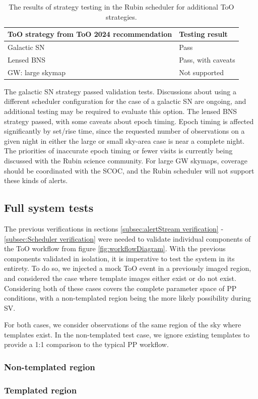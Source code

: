 \begin{table}[]
\centering
\begin{tabular}{|l|l|}
\hline
ToO strategy from ToO 2024 recommendation & Testing result       \\ \hline
Galactic SN                              & Pass                 \\ \hline
Lensed BNS                              & Pass, with caveats                 \\ \hline
GW: large skymap                              & Not supported                 \\ \hline
\end{tabular}
\caption{The results of strategy testing in the Rubin scheduler for additional ToO strategies.}
\label{tab:SVOptionalStrategy results}
\end{table}

The galactic SN strategy passed validation tests. Discussions about using a different scheduler configuration for the case of a galactic SN are ongoing, and additional testing may be required to evaluate this option. The lensed BNS strategy passed, with some caveats about epoch timing. Epoch timing is affected significantly by set/rise time, since the requested number of observations on a given night in either the large or small sky-area case is near a complete night. The priorities of inaccurate epoch timing or fewer visits is currently being discussed with the Rubin science community. For large GW skymaps, coverage should be coordinated with the SCOC, and the Rubin scheduler will not support these kinds of alerts.

\subsection{Full system tests}\label{subsec:systemTests verification}

The previous verifications in sections \ref{subsec:alertStream verification} - \ref{subsec:Scheduler verification} were needed to validate individual components of the ToO workflow from figure \ref{fig:workflowDiagram}. With the previous components validated in isolation, it is imperative to test the system in its entirety. To do so, we injected a mock ToO event in a previously imaged region, and considered the case where template images either exist or do not exist. Considering both of these cases covers the complete parameter space of PP conditions, with a non-templated region being the more likely possibility during SV.

For both cases, we consider observations of the same region of the sky where templates exist. In the non-templated test case, we ignore existing templates to provide a 1:1 comparison to the typical PP workflow.

\subsubsection{Non-templated region}\label{subsubsec:systemTests NonTemplated}


\subsubsection{Templated region}\label{subsubsec:systemTests templated}
